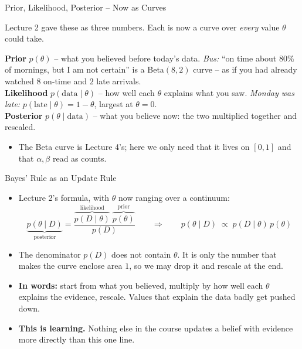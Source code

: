 \begin{frame}{Prior, Likelihood, Posterior -- Now as Curves}
\begin{rldefinition}
Lecture 2 gave these as three numbers. Each is now a curve over \emph{every} value $\theta$ could take.

\smallskip
\textbf{Prior} $p(\theta)$ -- what you believed before today's data. \emph{Bus:} ``on time about $80\%$ of mornings, but I am not certain'' is a Beta$(8,2)$ curve -- as if you had already watched $8$ on-time and $2$ late arrivals.\\
\textbf{Likelihood} $p(\text{data} \mid \theta)$ -- how well each $\theta$ explains what you saw. \emph{Monday was late:} $p(\text{late} \mid \theta) = 1 - \theta$, largest at $\theta = 0$.\\
\textbf{Posterior} $p(\theta \mid \text{data})$ -- what you believe now: the two multiplied together and rescaled.
\end{rldefinition}
\pause
\begin{itemize}
  \item The Beta curve is Lecture 4's; here we only need that it lives on $[0,1]$ and that $\alpha, \beta$ read as counts.
\end{itemize}
\end{frame}

\begin{frame}{Bayes' Rule as an Update Rule}
\begin{itemize}
  \item Lecture 2's formula, with $\theta$ now ranging over a continuum:
  \[
    \underbrace{p(\theta \mid D)}_{\text{posterior}}
      = \frac{\overbrace{p(D \mid \theta)}^{\text{likelihood}}\;\overbrace{p(\theta)}^{\text{prior}}}{p(D)}
    \qquad\Longrightarrow\qquad
    p(\theta \mid D) \;\propto\; p(D \mid \theta)\,p(\theta)
  \]
  \pause
  \item The denominator $p(D)$ does not contain $\theta$. It is only the number that makes the curve enclose area $1$, so we may drop it and rescale at the end.
  \pause
  \item \textbf{In words:} start from what you believed, multiply by how well each $\theta$ explains the evidence, rescale. Values that explain the data badly get pushed down.
  \pause
  \item \textbf{This is learning.} Nothing else in the course updates a belief with evidence more directly than this one line.
\end{itemize}
\end{frame}

